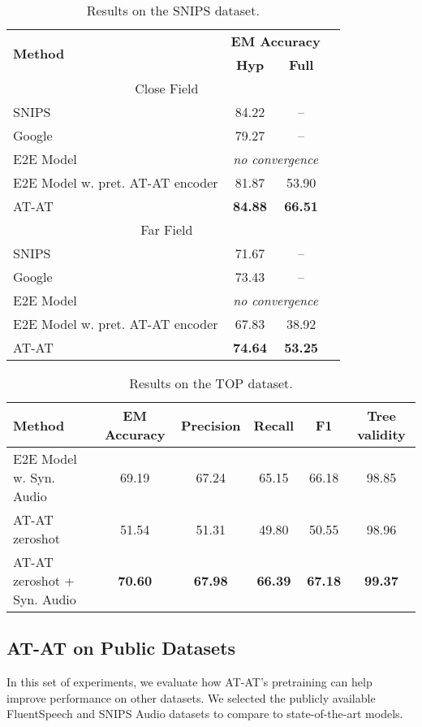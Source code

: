 \documentclass[letterpaper]{article} \usepackage{aaai21}  \usepackage{times}  \usepackage{helvet} \usepackage{courier}  \usepackage[hyphens]{url}  \usepackage{graphicx} \usepackage{booktabs}
\begin{document}
\begin{table}
\begin{tabular}{lccc}
\toprule
\multirow{2}{*}{\bf{Method}} & \multicolumn{2}{c}{\bf{EM Accuracy}} \\
& \bf{Hyp} & \bf{Full} \\ 
\midrule
\multicolumn{3}{c}{Close Field}\\
\midrule
SNIPS \cite{Saade2018SpokenLU} & 84.22 & -- \\
Google \cite{Saade2018SpokenLU} & 79.27 & -- \\
E2E Model & \multicolumn{2}{c}{\emph{no convergence}} \\
E2E Model w. pret. AT-AT encoder & 81.87 & 53.90 \\
AT-AT & \bf 84.88 & \bf 66.51 \\
\midrule
\multicolumn{3}{c}{Far Field}\\
\midrule
SNIPS \cite{Saade2018SpokenLU} & 71.67 & -- \\
Google \cite{Saade2018SpokenLU} & 73.43 & -- \\
E2E Model & \multicolumn{2}{c}{\emph{no convergence}} \\
E2E Model w. pret. AT-AT encoder & 67.83 & 38.92 \\
AT-AT & \bf 74.64 & \bf 53.25 \\
\bottomrule
\end{tabular}
\caption{
    Results on the SNIPS dataset.
}
\label{tab:snips}
\end{table}

\begin{table*}
\centering
\begin{tabular}{lccccc}
\toprule
\bf Method & \bf{EM Accuracy} & \bf Precision & \bf Recall & \bf{F1} & \bf{Tree validity}\\
\midrule
E2E Model w. Syn. Audio &  69.19 & 67.24 & 65.15 & 66.18 & 98.85\\
AT-AT zeroshot & 51.54 & 51.31 & 49.80 & 50.55 & 98.96 \\
AT-AT zeroshot + Syn. Audio & \bf 70.60 & \bf 67.98 & \bf 66.39 & \bf 67.18 & \bf 99.37\\
\bottomrule
\end{tabular}
\caption{
    Results on the TOP dataset. 
}
\label{tab:top}
\end{table*}

\subsection{AT-AT on Public Datasets}
In this set of experiments, we evaluate how AT-AT's pretraining can help improve performance on other datasets. We selected the publicly available FluentSpeech and SNIPS Audio datasets to compare to state-of-the-art models.
\end{document}
